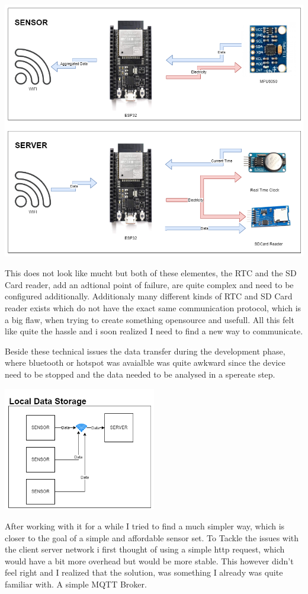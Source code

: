 \includegraphics[width=\linewidth]{images/CommunicationDiagrammExplenation.png}

This does not look like mucht but both of these elementes, the RTC and the SD Card reader, add an adtional point of failure, are quite complex and need to be configured additionally. Additionaly many different kinds of RTC and SD Card reader exists which do not have the exact same communication protocol, which is a big flaw, when trying to create something opensource and usefull. All this felt like quite the hassle and i soon realized I need to find a new way to communicate.

Beside these technical issues the data transfer during the development phase, where bluetooth or hotspot was avaialble was quite awkward since the device need to be stopped and the data needed to be analysed in a spereate step. 


\begin{center}
\includegraphics[width=0.5\textwidth]{images/CommunicationDiagrammLocal.png}
 \end{center}
After working with it for a while I tried to find a much simpler way, which is closer to the goal of a simple and affordable sensor set. To Tackle the issues with the client server network i first thought of using a simple http request, which would have a bit more overhead but would be more stable. This however didn't feel right and I realized that the solution, was something I already was quite familiar with. A simple MQTT Broker. 



